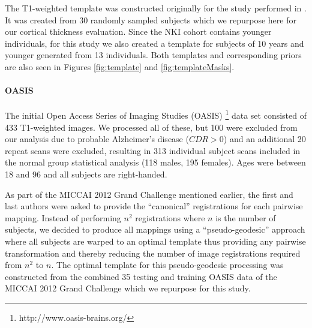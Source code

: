 The T1-weighted template was constructed originally for the study performed
in \cite{tustison2013}.  It was created from 30 randomly sampled subjects 
which we repurpose here for our cortical thickness evaluation.  Since the 
NKI cohort contains younger individuals, for this study we also created a 
template for subjects of 10 years and younger generated from 13 individuals.
Both templates and corresponding priors are also seen in Figures \ref{fig:template} and \ref{fig:templateMasks}.

\paragraph{OASIS}
The initial Open Access Series of Imaging Studies (OASIS)%
\footnote{
http://www.oasis-brains.org/
}
data set consisted of 433 T1-weighted images.  We processed all of these,
but 100 were excluded from our analysis due to probable Alzheimer's
disease ($CDR > 0$) and an additional 20 repeat scans were excluded,
 resulting in 313 individual subject scans included in the normal group statistical
analysis (118 males, 195 females).  Ages were between 18 and 96 and 
all subjects are right-handed.  

As part of the MICCAI 2012 Grand Challenge mentioned earlier, the first and
last authors were asked to provide the ``canonical'' registrations for each
pairwise mapping.  Instead of performing $n^2$ registrations where $n$ is
the number of subjects, we decided to produce all mappings using a 
``pseudo-geodesic'' approach where all subjects are warped to an optimal
template thus providing any pairwise transformation and thereby 
reducing the number of image registrations required from $n^2$ to $n$.
The optimal template for this pseudo-geodesic processing was constructed 
from the combined 35 testing and training OASIS data of the MICCAI 2012 Grand 
Challenge which we repurpose for this study.

